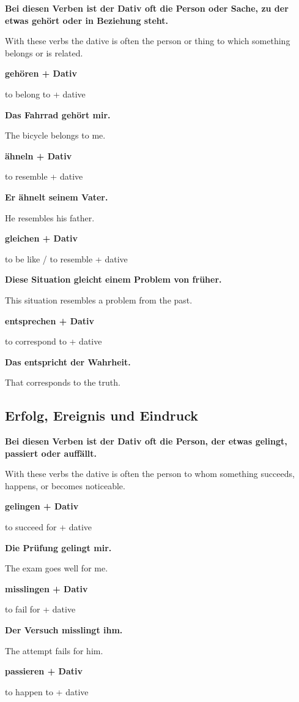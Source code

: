 \documentclass[a4paper]{article}
\newcommand{\EN}[1]{\par{\small\textcolor{TranslationGray}{#1}}\vspace{0.4em}}
\begin{document}
            \textbf{Bei diesen Verben ist der Dativ oft die Person oder Sache, zu der etwas gehört oder in Beziehung steht.}
            \EN{With these verbs the dative is often the person or thing to which something belongs or is related.}
            
            \textbf{gehören + Dativ}
            \EN{to belong to + dative}
            
            \textbf{Das Fahrrad gehört mir.}
            \EN{The bicycle belongs to me.}
            
            \textbf{ähneln + Dativ}
            \EN{to resemble + dative}
            
            \textbf{Er ähnelt seinem Vater.}
            \EN{He resembles his father.}
            
            \textbf{gleichen + Dativ}
            \EN{to be like / to resemble + dative}
            
            \textbf{Diese Situation gleicht einem Problem von früher.}
            \EN{This situation resembles a problem from the past.}
            
            \textbf{entsprechen + Dativ}
            \EN{to correspond to + dative}
            
            \textbf{Das entspricht der Wahrheit.}
            \EN{That corresponds to the truth.}
        
        \subsection{Erfolg, Ereignis und Eindruck}
            
            \textbf{Bei diesen Verben ist der Dativ oft die Person, der etwas gelingt, passiert oder auffällt.}
            \EN{With these verbs the dative is often the person to whom something succeeds, happens, or becomes noticeable.}
            
            \textbf{gelingen + Dativ}
            \EN{to succeed for + dative}
            
            \textbf{Die Prüfung gelingt mir.}
            \EN{The exam goes well for me.}
            
            \textbf{misslingen + Dativ}
            \EN{to fail for + dative}
            
            \textbf{Der Versuch misslingt ihm.}
            \EN{The attempt fails for him.}
            
            \textbf{passieren + Dativ}
            \EN{to happen to + dative}
            
\end{document}
